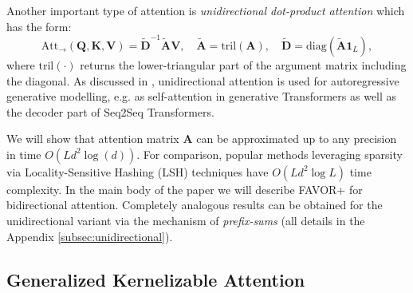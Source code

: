 Another important type of attention is \textit{unidirectional dot-product attention} which has the form:
\begin{equation}
    \mathrm{Att}_\to (\mathbf{Q}, \mathbf{K}, \mathbf{V}) = \widetilde{\mathbf{D}}^{-1} \widetilde{\mathbf{A}} \mathbf{V}, \quad %
    \widetilde{\mathbf{A}} = \mathrm{tril} (\mathbf{A}), \quad \widetilde{\mathbf{D}} = \mathrm{diag} ( \widetilde{\mathbf{A}} \mathbf{1}_L ) , \label{eq:uattnorm}
\end{equation}
where $\mathrm{tril}(\cdot)$ returns the lower-triangular part of the argument matrix including the diagonal. As discussed in \citep{transformer}, unidirectional attention is used for autoregressive generative modelling, e.g. as self-attention in generative Transformers as well as the decoder part of Seq2Seq Transformers.

We will show that attention matrix $\mathbf{A}$ can be approximated up to any precision in time $O (L d^2\log(d))$. For comparison, popular methods leveraging sparsity via Locality-Sensitive Hashing (LSH) techniques \citep{reformer} have $O(L d^2 \log L)$ time complexity. 
In the main body of the paper we will describe FAVOR+ for bidirectional attention. Completely analogous results can be obtained for the unidirectional variant via the mechanism of \textit{prefix-sums} (all details in the Appendix \ref{subsec:unidirectional}).

\subsection{Generalized Kernelizable Attention}
\label{sec:gka}

